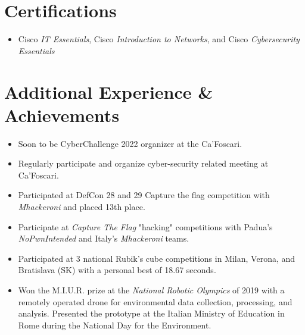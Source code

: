 \documentclass[letterpaper,10pt]{article}
\newcommand{\resumeSubHeadingListEntry}[1]{\item{#1}\vspace{-5pt}}
\newcommand{\resumeSubHeadingListStart}{\begin{itemize}[leftmargin=*]}
\newcommand{\resumeSubHeadingListEnd}{\end{itemize}}
\newcommand{\shorterSection}[1]{\vspace{-10pt}\section{#1}}
\begin{document}
\shorterSection{Certifications}
  \resumeSubHeadingListStart
    \small
    \resumeSubHeadingListEntry{Cisco \textit{IT Essentials}, Cisco \textit{Introduction to Networks}, and Cisco \textit{Cybersecurity Essentials}}
  \resumeSubHeadingListEnd

\shorterSection{Additional Experience \& Achievements}
  \resumeSubHeadingListStart
    \small
    \resumeSubHeadingListEntry{Soon to be CyberChallenge 2022 organizer at the Ca'Foscari.}
    \resumeSubHeadingListEntry{Regularly participate and organize cyber-security related meeting at Ca'Foscari.}
    \resumeSubHeadingListEntry{Participated at DefCon 28 and 29 Capture the flag competition with \textit{Mhackeroni} and placed 13th place.}
		\resumeSubHeadingListEntry{Participate at \textit{Capture The Flag} "hacking" competitions with Padua's \textit{NoPwnIntended} and Italy's \textit{Mhackeroni} teams.}
    \resumeSubHeadingListEntry{Participated at 3 national Rubik's cube competitions in Milan, Verona, and Bratislava (SK) with a personal best of 18.67 seconds.}
    \resumeSubHeadingListEntry{Won the M.I.U.R. prize at the \textit{National Robotic Olympics} of 2019 with a remotely operated drone for environmental data collection, processing, and analysis.  Presented the prototype at the Italian Ministry of Education in Rome during the National Day for the Environment.}
  \resumeSubHeadingListEnd
\end{document}
